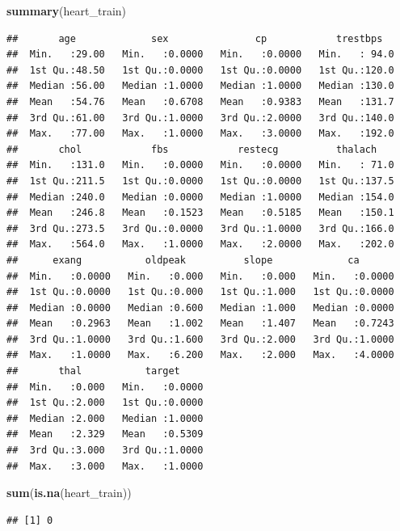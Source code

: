 \documentclass[
]{article}
\newenvironment{Shaded}{\begin{snugshade}}{\end{snugshade}}
\newcommand{\FunctionTok}[1]{\textcolor[rgb]{0.13,0.29,0.53}{\textbf{#1}}}
\newcommand{\NormalTok}[1]{#1}
\begin{document}
\begin{Shaded}
\begin{Highlighting}[]
\FunctionTok{summary}\NormalTok{(heart\_train)}
\end{Highlighting}
\end{Shaded}

\begin{verbatim}
##       age             sex               cp            trestbps    
##  Min.   :29.00   Min.   :0.0000   Min.   :0.0000   Min.   : 94.0  
##  1st Qu.:48.50   1st Qu.:0.0000   1st Qu.:0.0000   1st Qu.:120.0  
##  Median :56.00   Median :1.0000   Median :1.0000   Median :130.0  
##  Mean   :54.76   Mean   :0.6708   Mean   :0.9383   Mean   :131.7  
##  3rd Qu.:61.00   3rd Qu.:1.0000   3rd Qu.:2.0000   3rd Qu.:140.0  
##  Max.   :77.00   Max.   :1.0000   Max.   :3.0000   Max.   :192.0  
##       chol            fbs            restecg          thalach     
##  Min.   :131.0   Min.   :0.0000   Min.   :0.0000   Min.   : 71.0  
##  1st Qu.:211.5   1st Qu.:0.0000   1st Qu.:0.0000   1st Qu.:137.5  
##  Median :240.0   Median :0.0000   Median :1.0000   Median :154.0  
##  Mean   :246.8   Mean   :0.1523   Mean   :0.5185   Mean   :150.1  
##  3rd Qu.:273.5   3rd Qu.:0.0000   3rd Qu.:1.0000   3rd Qu.:166.0  
##  Max.   :564.0   Max.   :1.0000   Max.   :2.0000   Max.   :202.0  
##      exang           oldpeak          slope             ca        
##  Min.   :0.0000   Min.   :0.000   Min.   :0.000   Min.   :0.0000  
##  1st Qu.:0.0000   1st Qu.:0.000   1st Qu.:1.000   1st Qu.:0.0000  
##  Median :0.0000   Median :0.600   Median :1.000   Median :0.0000  
##  Mean   :0.2963   Mean   :1.002   Mean   :1.407   Mean   :0.7243  
##  3rd Qu.:1.0000   3rd Qu.:1.600   3rd Qu.:2.000   3rd Qu.:1.0000  
##  Max.   :1.0000   Max.   :6.200   Max.   :2.000   Max.   :4.0000  
##       thal           target      
##  Min.   :0.000   Min.   :0.0000  
##  1st Qu.:2.000   1st Qu.:0.0000  
##  Median :2.000   Median :1.0000  
##  Mean   :2.329   Mean   :0.5309  
##  3rd Qu.:3.000   3rd Qu.:1.0000  
##  Max.   :3.000   Max.   :1.0000
\end{verbatim}

\begin{Shaded}
\begin{Highlighting}[]
\FunctionTok{sum}\NormalTok{(}\FunctionTok{is.na}\NormalTok{(heart\_train))}
\end{Highlighting}
\end{Shaded}

\begin{verbatim}
## [1] 0
\end{verbatim}
\end{document}

